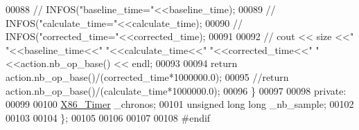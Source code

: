 \begin{DoxyCode}
00088 \textcolor{comment}{//     INFOS("baseline\_time="<<baseline\_time);}
00089 \textcolor{comment}{//     INFOS("calculate\_time="<<calculate\_time);}
00090 \textcolor{comment}{//     INFOS("corrected\_time="<<corrected\_time);}
00091 
00092 \textcolor{comment}{//    cout << size <<" "<<baseline\_time<<" "<<calculate\_time<<" "<<corrected\_time<<" "<<action.nb\_op\_base()
       << endl;}
00093 
00094     \textcolor{keywordflow}{return} action.nb\_op\_base()/(corrected\_time*1000000.0);
00095     \textcolor{comment}{//return action.nb\_op\_base()/(calculate\_time*1000000.0);}
00096   \}
00097 
00098 \textcolor{keyword}{private}:
00099 
00100   \hyperlink{class_x86___timer}{X86\_Timer} \_chronos;
00101   \textcolor{keywordtype}{unsigned} \textcolor{keywordtype}{long} \textcolor{keywordtype}{long} \_nb\_sample;
00102 
00103 
00104 \};
00105 
00106 
00107 
00108 \textcolor{preprocessor}{#endif}
\end{DoxyCode}
